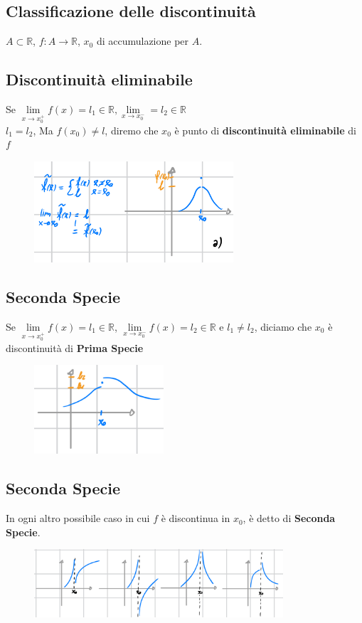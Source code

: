 \documentclass{article}
\newcommand{\R}{\mathbb{R}}
\begin{document}
\begin{flushleft}
\section{Classificazione delle discontinuità}
$A \subset \R$, $f: A \rightarrow \R$, $x_0$ di accumulazione per $A$.

\subsection{Discontinuità eliminabile}
Se $\lim\limits_{x \to x_0^+} f(x) = l_1 \in \R, \lim\limits_{x \to x_0^-} = l_2 \in \R$\\
$l_1 = l_2$, Ma $f(x_0) \neq l$, diremo che $x_0$ è punto di \textbf{discontinuità eliminabile} di $f$
\begin{figure}[h]
    \centering
    \includegraphics[width=20em]{./images/discontinuita_eliminabile.jpeg}
\end{figure}
\FloatBarrier
\subsection{Seconda Specie}
Se $\lim\limits_{x \to x_0^+}f(x)= l_1 \in \R$, $\lim\limits_{x \to x_0^-}f(x)=l_2 \in \R$ e $l_1 \neq l_2$, diciamo che $x_0$ è discontinuità di \textbf{Prima Specie}
\begin{figure}[h]
    \centering
    \includegraphics[width=13em]{./images/prima_specie.jpeg}
\end{figure}
\FloatBarrier
\subsection{Seconda Specie}
In ogni altro possibile caso in cui $f$ è discontinua in $x_0$, è detto di \textbf{Seconda Specie}.
\begin{figure}[h]
    \centering
    \includegraphics[width=25em]{./images/seconda_specie.jpeg}
\end{figure}
\FloatBarrier

\end{flushleft}
\end{document}
